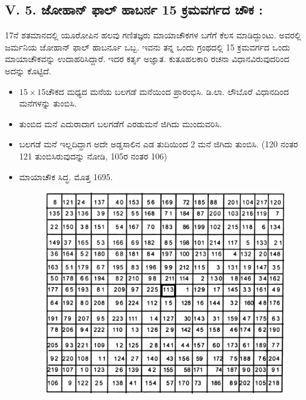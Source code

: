 \subsection*{V. 5. ಜೋಹಾನ್ ಫಾಲ್ ಹಾಬರ್ನ 15 ಕ್ರಮವರ್ಗದ ಚೌಕ :}

17ನೆ ಶತಮಾನದಲ್ಲಿ ಯೂರೋಪಿನ ಹಲವು ಗಣಿತಜ್ಞರು ಮಾಯಾಚೌಕಗಳ ಬಗೆಗೆ ಕೆಲಸ ಮಾಡಿದ್ದುಂಟು. ಅವರಲ್ಲಿ ಜರ್ಮನಿಯ ಜೋಹಾನ್ ಫಾಲ್ ಹಾಬರ್ನೂ ಒಬ್ಬ. ಇವನು ತನ್ನ ಒಂದು ಗ್ರಂಥದಲ್ಲಿ 15 ಕ್ರಮವರ್ಗದ ಒಂದು ಮಾಯಾಚೌಕವನ್ನು ಉದಾಹರಿಸಿದ್ದಾರೆ. ಇದರ ಕರ್ತೃ ಅಜ್ಞಾತ. ಕುತೂಹಲಕಾರಿ ರಚನಾ ವಿಧಾನವಿರುವುದರಿಂದ ಅದನ್ನು ಕೊಟ್ಟಿದೆ.
\begin{itemize}
	\item $15 \times 15$ಚೌಕದ ಮಧ್ಯದ ಮನೆಯ ಬಲಗಡೆ ಮನೆಯಿಂದ ಪ್ರಾರಂಭಿಸಿ. ಡಿ.ಲಾ. ಲೌಬೊರೆ ವಿಧಾನದಿಂದ ಮನೆಗಳನ್ನು ತುಂಬಿಸಿ.
	\item ತುಂಬಿದ ಮನೆ ಎದುರಾದಾಗ ಬಲಗಡೆಗೆ ಎರಡುಮನೆ ಜಿಗಿದು ಮುಂದುವರಿಸಿ.
	\item ಬಲಗಡೆ ಮನೆ ಇಲ್ಲದಿದ್ದಾಗ ಅದೇ ಅಡ್ಡಸಾಲಿನ ಎಡ ತುದಿಯಿಂದ 2 ಮನೆ ಜಿಗಿದು ತುಂಬಿಸಿ. (120 ನಂತರ 121 ತುಂಬಿಸಿರುವುದನ್ನು ನೋಡಿ, 105ರ ನಂತರ 106)
	\item ಮಾಯಾಚೌಕ ಸಿದ್ಧ. ಮೊತ್ತ 1695.
	\begin{figure}[H]
	\includegraphics{src/figures/chap4/fig4-23.jpg}
	\end{figure}
\end{itemize}
